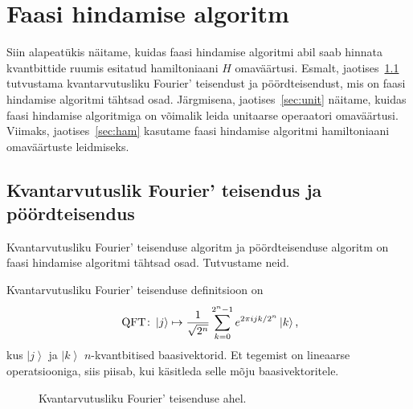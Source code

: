 \documentclass[12pt]{report}
\def\ket#1{\left|#1\right>}
\def\QFT{\mathop{\rm QFT}\nolimits}
\begin{document}
\section{Faasi hindamise algoritm}\label{sec:pea}

Siin alapeatükis näitame, kuidas faasi hindamise algoritmi abil saab hinnata kvantbittide ruumis esitatud hamiltoniaani \(H\) omaväärtusi.
Esmalt, jaotises~\ref{sec:qftdef} tutvustama kvantarvutusliku Fourier' teisendust ja pöördteisendust, mis on faasi hindamise algoritmi tähtsad osad.
Järgmisena, jaotises~\ref{sec:unit} näitame, kuidas faasi hindamise algoritmiga on võimalik leida unitaarse operaatori omaväärtusi.
Viimaks, jaotises~\ref{sec:ham} kasutame faasi hindamise algoritmi hamiltoniaani omaväärtuste leidmiseks.

\subsection{Kvantarvutuslik Fourier' teisendus ja pöördteisendus}\label{sec:qftdef}

Kvantarvutusliku Fourier' teisenduse algoritm ja pöördteisenduse algoritm on faasi hindamise algoritmi tähtsad osad.
Tutvustame neid.

Kvantarvutusliku Fourier' teisenduse definitsioon on
\begin{align}\label{eq:qftdef}
    \QFT\colon
    \ket{j} \mapsto \frac{1}{\sqrt{2^n}} \sum_{k=0}^{2^n-1} e^{2\pi ijk/2^n} \ket{k} \rlap{,}
\end{align}
kus \(\ket{j}\) ja \(\ket{k}\) \(n\)-kvantbitised baasivektorid.
Et tegemist on lineaarse operatsiooniga, siis piisab, kui käsitleda selle mõju baasivektoritele.

\begin{figure}
    \centering
    \ifdefined\yquanton
    \fi
    \caption{Kvantarvutusliku Fourier' teisenduse ahel.}
    \label{fig:qft}
\end{figure}
\end{document}
